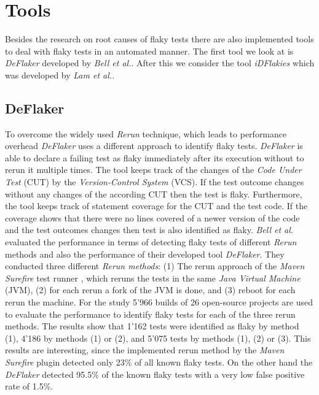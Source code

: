 \documentclass{seal_thesis}
\begin{document}
\section{Tools} \label{sec:tools}
Besides the research on root causes of flaky tests there are also implemented tools to deal with flaky tests in an automated manner. The first tool we look at is \textit{DeFlaker} developed by \textit{Bell et al.}\cite{bell18}. After this we consider the tool \textit{iDFlakies} which was developed by \textit{Lam et al.}\cite{lam19}. \\

\subsection{DeFlaker}
\noindent To overcome the widely used \textit{Rerun} technique, which leads to performance overhead \textit{DeFlaker} uses a different approach to identify flaky tests. \textit{DeFlaker} is able to declare a failing test as flaky immediately after its execution without to rerun it multiple times. The tool keeps track of the changes of the \textit{Code Under Test} (CUT) by the \textit{Version-Control System} (VCS). If the test outcome changes without any changes of the according CUT then the test is flaky. Furthermore, the tool keeps track of statement coverage for the CUT and the test code. If the coverage shows that there were no lines covered of a newer version of the code and the test outcomes changes then test is also identified as flaky. \textit{Bell et al.} evaluated the performance in terms of detecting flaky tests of different \textit{Rerun} methods and also the performance of their developed tool \textit{DeFlaker}. They conducted three different \textit{Rerun methods}: (1) The rerun approach of the \textit{Maven Surefire} test runner \cite{maven}, which reruns the tests in the same \textit{Java Virtual Machine} (JVM), (2) for each rerun a fork of the JVM is done, and (3) reboot for each rerun the machine. For the study 5'966 builds of 26 open-source projects are used to evaluate the performance to identify flaky tests for each of the three rerun methods. The results show that 1'162 tests were identified as flaky by method (1), 4'186 by methods (1) or (2), and 5'075 tests by methods (1), (2) or (3). This results are interesting, since the implemented rerun method by the \textit{Maven Surefire} plugin detected only 23\% of all known flaky tests. On the other hand the \textit{DeFlaker} detected 95.5\% of the known flaky tests with a very low false positive rate of 1.5\%. \\
\end{document}
